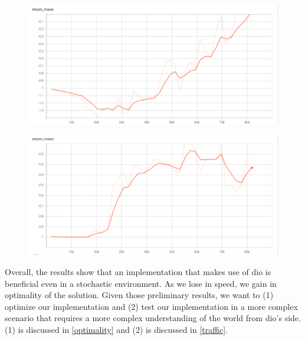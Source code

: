     \begin{figure}[H]
      \centering
      \begin{minipage}{.5\textwidth}
        \centering
        \includegraphics[width=1\linewidth]{figures/dioreturn.png}
        \label{fig:returndio}
      \end{minipage}%
      \begin{minipage}{.5\textwidth}
        \centering
        \includegraphics[width=1\linewidth]{figures/rlreturn.png}
        \label{fig:returnrl}
      \end{minipage}
    \end{figure}

    Overall, the results show that an implementation that makes use of
    dio is beneficial even in a stochastic environment. 
    As we lose in speed, we gain in optimality of the solution. 
    Given those preliminary results, we want to (1) optimize our implementation 
    and (2) test our implementation in a more complex scenario that requires a more complex understanding of the world 
    from dio's side. (1) is discussed in \ref{optimality} and (2) is discussed in \ref{traffic}. 

